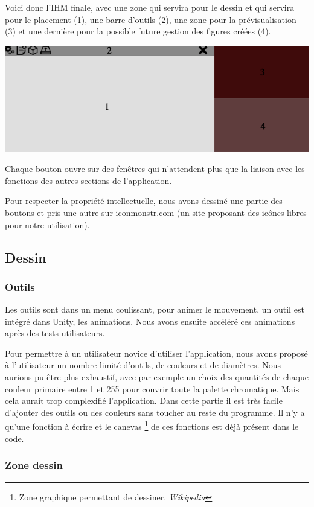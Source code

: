 \documentclass[a4paper,11pt]{article}
\begin{document}
			Voici donc l'IHM finale, avec une zone qui servira pour le dessin et qui servira pour le placement (1), une barre d'outils (2), une zone pour la prévisualisation (3) et une dernière pour la possible future gestion des figures créées (4).
			
			\centerline{\includegraphics[scale=0.5]{images/ihm.png}}

			Chaque bouton ouvre sur des fenêtres qui n'attendent plus que la liaison avec les fonctions des autres sections de l'application.
			
			Pour respecter la propriété intellectuelle, nous avons dessiné une partie des boutons et pris une autre sur iconmonstr.com\cite{iconmonstr} (un site proposant des icônes libres pour notre utilisation).
		\subsection{Dessin}
		
			\subsubsection{Outils}	%
						
				Les outils sont dans un menu coulissant, pour animer le mouvement, un outil est intégré dans Unity, les animations. Nous avons ensuite accéléré ces animations après des tests utilisateurs.
					
				Pour permettre à un utilisateur novice d'utiliser l'application, nous avons proposé à l'utilisateur un nombre limité d'outils, de couleurs et de diamètres. Nous aurions pu être plus exhaustif, avec par exemple un choix des quantités de chaque couleur primaire entre 1 et 255 pour couvrir toute la palette chromatique. Mais cela aurait trop complexifié l'application.
				Dans cette partie il est très facile d'ajouter des outils ou des couleurs sans toucher au reste du programme. Il n'y a qu'une fonction à écrire et le canevas \footnote{Zone graphique permettant de dessiner. \emph{Wikipedia}} de ces fonctions est déjà présent dans le code.
			\subsubsection{Zone dessin} %
			
\end{document}
